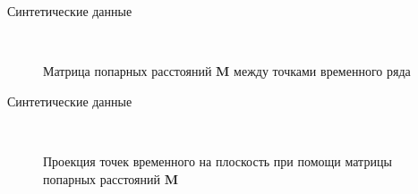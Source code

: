 \documentclass{beamer}
\begin{document}
\begin{frame}{Синтетические данные}
	\begin{figure}[h!t]\center
		\\
		\caption{Матрица попарных расстояний $\textbf{M}$ между точками временного ряда}
	\end{figure}
\end{frame}
\begin{frame}{Синтетические данные}
	\begin{figure}[h!t]\center
		\\
		\caption{Проекция точек временного на плоскость при помощи матрицы попарных расстояний $\textbf{M}$}
	\end{figure}
\end{frame}
\end{document}
